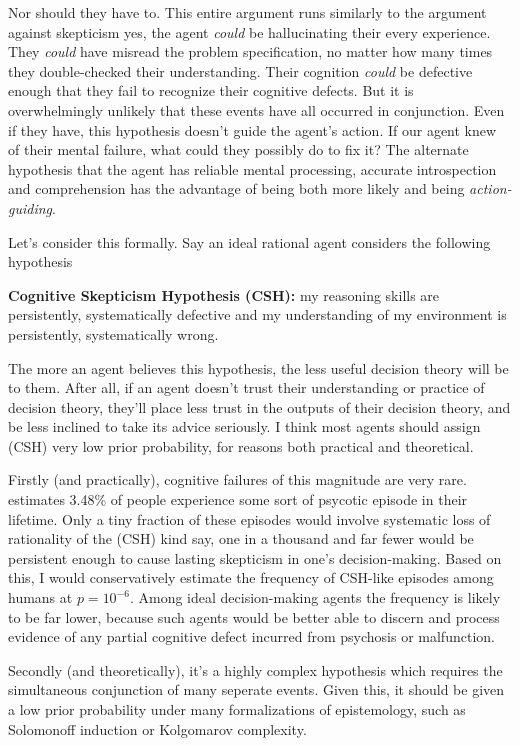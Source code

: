 \documentclass{article}
\begin{document}
Nor should they have to. This entire argument runs similarly to the argument against skepticism \textemdash{} yes, the agent \textit{could} be hallucinating their every experience. They \textit{could} have misread the problem specification, no matter how many times they double-checked their understanding. Their cognition \textit{could} be defective enough that they fail to recognize their cognitive defects. But it is overwhelmingly unlikely that these events have all occurred in conjunction. Even if they have, this hypothesis doesn't guide the agent's action. If our agent knew of their mental failure, what could they possibly do to fix it? The alternate hypothesis \textemdash{} that the agent has reliable mental processing, accurate introspection and comprehension \textemdash{} has the advantage of being both more likely and being \textit{action-guiding}. 

Let's consider this formally. Say an ideal rational agent considers the following hypothesis

\textbf{Cognitive Skepticism Hypothesis (CSH):} my reasoning skills are persistently, systematically defective and my understanding of my environment is persistently, systematically wrong.

The more an agent believes this hypothesis, the less useful decision theory will be to them. After all, if an agent doesn't trust their understanding or practice of decision theory, they'll place less trust in the outputs of their decision theory, and be less inclined to take its advice seriously. I think most agents should assign (CSH) very low prior probability, for reasons both practical and theoretical.

Firstly (and practically), cognitive failures of this magnitude are very rare. \citep{perala2007lifetime} estimates 3.48\% of people experience some sort of psycotic episode in their lifetime. Only a tiny fraction of these episodes would involve systematic loss of rationality of the (CSH) kind \textemdash{} say, one in a thousand \textemdash{} and far fewer would be persistent enough to cause lasting skepticism in one's decision-making. Based on this, I would conservatively estimate the frequency of CSH-like episodes among humans at \(p = 10^{-6}\). Among ideal decision-making agents the frequency is likely to be far lower, because such agents would be better able to discern and process evidence of any partial cognitive defect incurred from psychosis or malfunction.

Secondly (and theoretically), it's a highly complex hypothesis which requires the simultaneous conjunction of many seperate events. Given this, it should be given a low prior probability under many formalizations of epistemology, such as Solomonoff induction or Kolgomarov complexity.
\end{document}
